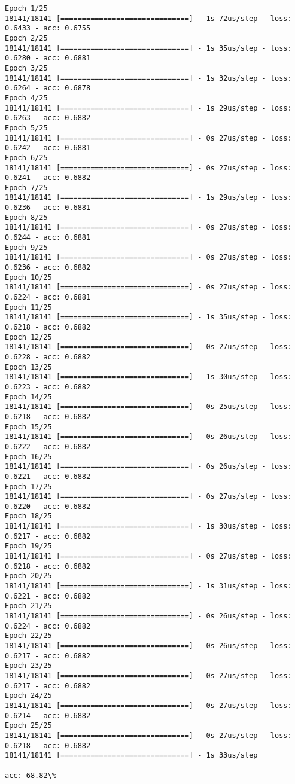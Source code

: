 \documentclass[11pt]{article}
\begin{document}
    \begin{Verbatim}[commandchars=\\\{\}]
Epoch 1/25
18141/18141 [==============================] - 1s 72us/step - loss: 0.6433 - acc: 0.6755
Epoch 2/25
18141/18141 [==============================] - 1s 35us/step - loss: 0.6280 - acc: 0.6881
Epoch 3/25
18141/18141 [==============================] - 1s 32us/step - loss: 0.6264 - acc: 0.6878
Epoch 4/25
18141/18141 [==============================] - 1s 29us/step - loss: 0.6263 - acc: 0.6882
Epoch 5/25
18141/18141 [==============================] - 0s 27us/step - loss: 0.6242 - acc: 0.6881
Epoch 6/25
18141/18141 [==============================] - 0s 27us/step - loss: 0.6241 - acc: 0.6882
Epoch 7/25
18141/18141 [==============================] - 1s 29us/step - loss: 0.6236 - acc: 0.6881
Epoch 8/25
18141/18141 [==============================] - 0s 27us/step - loss: 0.6244 - acc: 0.6881
Epoch 9/25
18141/18141 [==============================] - 0s 27us/step - loss: 0.6236 - acc: 0.6882
Epoch 10/25
18141/18141 [==============================] - 0s 27us/step - loss: 0.6224 - acc: 0.6881
Epoch 11/25
18141/18141 [==============================] - 1s 35us/step - loss: 0.6218 - acc: 0.6882
Epoch 12/25
18141/18141 [==============================] - 0s 27us/step - loss: 0.6228 - acc: 0.6882
Epoch 13/25
18141/18141 [==============================] - 1s 30us/step - loss: 0.6223 - acc: 0.6882
Epoch 14/25
18141/18141 [==============================] - 0s 25us/step - loss: 0.6218 - acc: 0.6882
Epoch 15/25
18141/18141 [==============================] - 0s 26us/step - loss: 0.6222 - acc: 0.6882
Epoch 16/25
18141/18141 [==============================] - 0s 26us/step - loss: 0.6221 - acc: 0.6882
Epoch 17/25
18141/18141 [==============================] - 0s 27us/step - loss: 0.6220 - acc: 0.6882
Epoch 18/25
18141/18141 [==============================] - 1s 30us/step - loss: 0.6217 - acc: 0.6882
Epoch 19/25
18141/18141 [==============================] - 0s 27us/step - loss: 0.6218 - acc: 0.6882
Epoch 20/25
18141/18141 [==============================] - 1s 31us/step - loss: 0.6221 - acc: 0.6882
Epoch 21/25
18141/18141 [==============================] - 0s 26us/step - loss: 0.6224 - acc: 0.6882
Epoch 22/25
18141/18141 [==============================] - 0s 26us/step - loss: 0.6217 - acc: 0.6882
Epoch 23/25
18141/18141 [==============================] - 0s 27us/step - loss: 0.6217 - acc: 0.6882
Epoch 24/25
18141/18141 [==============================] - 0s 27us/step - loss: 0.6214 - acc: 0.6882
Epoch 25/25
18141/18141 [==============================] - 0s 27us/step - loss: 0.6218 - acc: 0.6882
18141/18141 [==============================] - 1s 33us/step

acc: 68.82\%

    \end{Verbatim}
\end{document}
